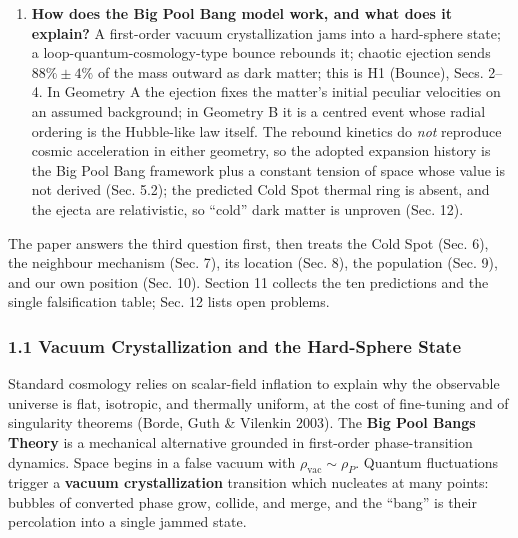\documentclass[
]{article}
\begin{document}
\begin{enumerate}
  \(+0.6/-0.4\) dex, and a curl-mode test, P8 (Curl Test),
  pre-registered. The eight extreme spots of the Planck map are the
  candidate list for a population of such neighbours, H4 (Population)
  and H7 (Pool Model), treated in Sec. 9.
\item
  \textbf{How does the Big Pool Bang model work, and what does it
  explain?} A first-order vacuum crystallization jams into a hard-sphere
  state; a loop-quantum-cosmology-type bounce rebounds it; chaotic
  ejection sends \(88\% \pm 4\%\) of the mass outward as dark matter;
  this is H1 (Bounce), Secs. 2--4. In Geometry A the ejection fixes the
  matter's initial peculiar velocities on an assumed background; in
  Geometry B it is a centred event whose radial ordering is the
  Hubble-like law itself. The rebound kinetics do \emph{not} reproduce
  cosmic acceleration in either geometry, so the adopted expansion
  history is the Big Pool Bang framework plus a constant tension of
  space whose value is not derived (Sec. 5.2); the predicted Cold Spot
  thermal ring is absent, and the ejecta are relativistic, so ``cold''
  dark matter is unproven (Sec. 12).
\end{enumerate}

The paper answers the third question first, then treats the Cold Spot
(Sec. 6), the neighbour mechanism (Sec. 7), its location (Sec. 8), the
population (Sec. 9), and our own position (Sec. 10). Section 11 collects
the ten predictions and the single falsification table; Sec. 12 lists
open problems.

\hypertarget{vacuum-crystallization-and-the-hard-sphere-state}{%
\subsubsection{\texorpdfstring{\textbf{1.1 Vacuum Crystallization and
the Hard-Sphere
State}}{1.1 Vacuum Crystallization and the Hard-Sphere State}}\label{vacuum-crystallization-and-the-hard-sphere-state}}

Standard cosmology relies on scalar-field inflation to explain why the
observable universe is flat, isotropic, and thermally uniform, at the
cost of fine-tuning and of singularity theorems (Borde, Guth \& Vilenkin
2003). The \textbf{Big Pool Bangs Theory} is a mechanical alternative
grounded in first-order phase-transition dynamics. Space begins in a
false vacuum with \(\rho_{\text{vac}} \sim \rho_P\). Quantum
fluctuations trigger a \textbf{vacuum crystallization} transition which
nucleates at many points: bubbles of converted phase grow, collide, and
merge, and the ``bang'' is their percolation into a single jammed state.
\end{document}
